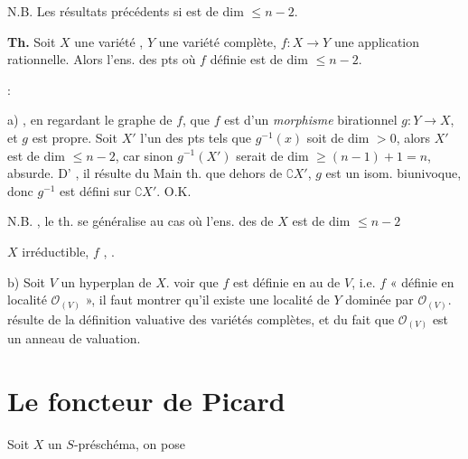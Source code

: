 \documentclass[11pt,a4paper]{article}
\begin{document}
\struck{\ill{}} N.B. Les résultats précédents  \ill{} \ill{}  si \struck{\ill{}}  est de dim $\leqslant n-2$.

\textbf{Th.} Soit $X$ une variété \struck{\ill{} \ill{}} , $Y$ une variété complète, $f : X \to Y$ une application rationnelle. Alors l'ens. des pts où $f$ \ill{}  définie est de dim $\leqslant n-2$.

 :

a) \ill{} \ill{} \ill{}, en regardant le graphe de $f$, que $f$ est  d'un \emph{morphisme} birationnel $g : Y \to X$, et $g$ est \struck{\ill{}} propre.
\struck{\ill{}} Soit $X'$ l'un des pts \struck{\ill{}} \ill{} tels que $g^{-1}(x)$ soit de dim $> 0$, alors $X'$ est de dim $\leqslant n-2$, car sinon $g^{-1}(X')$ serait de dim $\geqslant (n-1)+1 = n$, absurde.  D'\ill{} , il résulte du Main th. que \ill{} dehors de $\complement X'$, $g$ est un isom. biunivoque, donc $g^{-1}$ est défini sur $\complement X'$. O.K.

N.B. , le th. se généralise \ill{} \ill{} au cas où \struck{\ill{}} l'ens. des  de $X$ est de dim $\leqslant n-2$

\ill{} \ill{} $X$ irréductible, $f$  \ill{}, \ill{}  \ill{}.

b) Soit $V$ un hyperplan  de $X$. \ill{} voir que $f$ est définie en  \ill{} au  \ill{} de $V$, \struck{\ill{}} i.e. $f$ « définie en \ill{} localité $\mathcal{O}_{(V)}$ », il faut montrer qu'il existe une localité de $Y$ dominée par $\mathcal{O}_{(V)}$.  \ill{} résulte de la définition valuative des variétés complètes, et du fait que $\mathcal{O}_{(V)}$ est un anneau de valuation.

\section{Le foncteur de Picard}

Soit $X$ un $S$-préschéma, on pose
\end{document}
